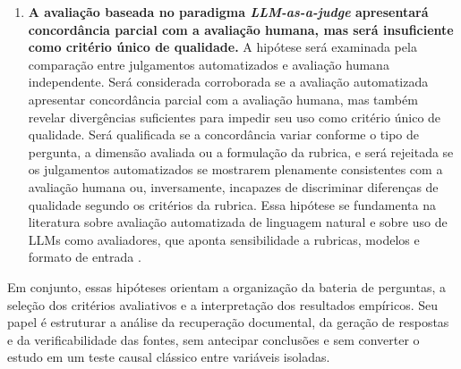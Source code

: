 \begin{enumerate}[label=\textbf{H\arabic*.}]
  \item \textbf{A avaliação baseada no paradigma \textit{LLM-as-a-judge} apresentará concordância parcial com a avaliação humana, mas será insuficiente como critério único de qualidade.} A hipótese será examinada pela comparação entre julgamentos automatizados e avaliação humana independente. Será considerada corroborada se a avaliação automatizada apresentar concordância parcial com a avaliação humana, mas também revelar divergências suficientes para impedir seu uso como critério único de qualidade. Será qualificada se a concordância variar conforme o tipo de pergunta, a dimensão avaliada ou a formulação da rubrica, e será rejeitada se os julgamentos automatizados se mostrarem plenamente consistentes com a avaliação humana ou, inversamente, incapazes de discriminar diferenças de qualidade segundo os critérios da rubrica. Essa hipótese se fundamenta na literatura sobre avaliação automatizada de linguagem natural e sobre uso de LLMs como avaliadores, que aponta sensibilidade a rubricas, modelos e formato de entrada \parencite{liuEtAl2023geval,liuEtAl2025judgeRag}.

\end{enumerate}

Em conjunto, essas hipóteses orientam a organização da bateria de perguntas, a seleção dos critérios avaliativos e a interpretação dos resultados empíricos. Seu papel é estruturar a análise da recuperação documental, da geração de respostas e da verificabilidade das fontes, sem antecipar conclusões e sem converter o estudo em um teste causal clássico entre variáveis isoladas.


